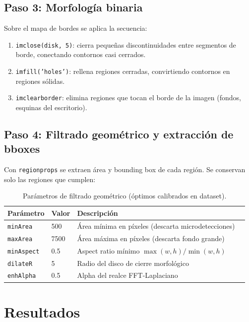 \documentclass[11pt,a4paper]{article}
\begin{document}
\subsection{Paso 3: Morfología binaria}

Sobre el mapa de bordes se aplica la secuencia:
\begin{enumerate}
    \item \texttt{imclose(disk, 5)}: cierra pequeñas discontinuidades entre segmentos
          de borde, conectando contornos casi cerrados.
    \item \texttt{imfill('holes')}: rellena regiones cerradas, convirtiendo contornos
          en regiones sólidas.
    \item \texttt{imclearborder}: elimina regiones que tocan el borde de la imagen
          (fondos, esquinas del escritorio).
\end{enumerate}

\subsection{Paso 4: Filtrado geométrico y extracción de bboxes}

Con \texttt{regionprops} se extraen área y bounding box de cada región. Se conservan
solo las regiones que cumplen:

\begin{table}[H]
\centering
\caption{Parámetros de filtrado geométrico (óptimos calibrados en dataset).}
\label{tab:det_params}
\begin{tabular}{@{}llll@{}}
\toprule
Parámetro & Valor & Descripción \\
\midrule
\texttt{minArea}   & 500    & Área mínima en píxeles (descarta microdetecciones) \\
\texttt{maxArea}   & 7500   & Área máxima en píxeles (descarta fondo grande) \\
\texttt{minAspect} & 0.5    & Aspect ratio mínimo $\max(w,h)/\min(w,h)$ \\
\texttt{dilateR}   & 5      & Radio del disco de cierre morfológico \\
\texttt{enhAlpha}  & 0.5    & Alpha del realce FFT-Laplaciano \\
\bottomrule
\end{tabular}
\end{table}

\section{Resultados}
\label{sec:resultados}
\end{document}
